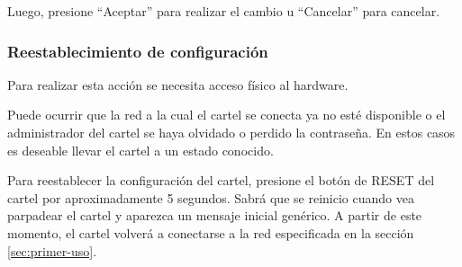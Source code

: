 Luego, presione \enquote{Aceptar} para realizar el cambio u \enquote{Cancelar} para cancelar.

\subsubsection{Reestablecimiento de configuración}\label{sec:guia-reset}
Para realizar esta acción se necesita acceso físico al hardware.

Puede ocurrir que la red a la cual el cartel se conecta ya no esté disponible o el administrador del cartel se haya olvidado o perdido la contraseña. En estos casos es deseable llevar el cartel a un estado conocido.

Para reestablecer la configuración del cartel, presione el botón de RESET del cartel por aproximadamente 5 segundos. Sabrá que se reinicio cuando vea parpadear el cartel y aparezca un mensaje inicial genérico. A partir de este momento, el cartel volverá a conectarse a la red especificada en la sección \ref{sec:primer-uso}.
